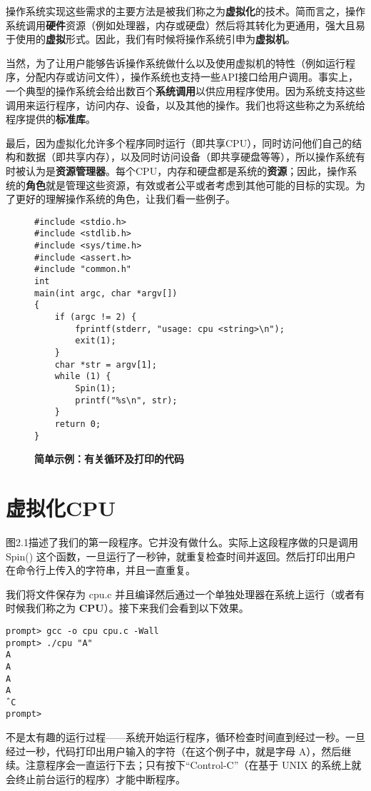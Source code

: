 操作系统实现这些需求的主要方法是被我们称之为\textbf{虚拟化}的技术。简而言之，操作系统调用\textbf{硬件}资源（例如处理器，内存或硬盘）然后将其转化为更通用，强大且易于使用的\textbf{虚拟}形式。因此，我们有时候将操作系统引申为\textbf{虚拟机}。

当然，为了让用户能够告诉操作系统做什么以及使用虚拟机的特性（例如运行程序，分配内存或访问文件），操作系统也支持一些API接口给用户调用。事实上，一个典型的操作系统会给出数百个\textbf{系统调用}以供应用程序使用。因为系统支持这些调用来运行程序，访问内存、设备，以及其他的操作。我们也将这些称之为系统给程序提供的\textbf{标准库}。

最后，因为虚拟化允许多个程序同时运行（即共享CPU），同时访问他们自己的结构和数据（即共享内存），以及同时访问设备（即共享硬盘等等），所以操作系统有时被认为是\textbf{资源管理器}。每个CPU，内存和硬盘都是系统的\textbf{资源}；因此，操作系统的\textbf{角色}就是管理这些资源，有效或者公平或者考虑到其他可能的目标的实现。为了更好的理解操作系统的角色，让我们看一些例子。

\newpage

\begin{figure}[ht]
\begin{lstlisting}  
#include <stdio.h> 
#include <stdlib.h> 
#include <sys/time.h> 
#include <assert.h> 
#include "common.h"
int
main(int argc, char *argv[])
{
    if (argc != 2) {
        fprintf(stderr, "usage: cpu <string>\n");
        exit(1);
    }
    char *str = argv[1];
    while (1) {
        Spin(1);
        printf("%s\n", str);
    }
    return 0;
}
\end{lstlisting}
\caption{\textbf{简单示例：有关循环及打印的代码}}
\end{figure}

\section{虚拟化CPU}
    
图2.1描述了我们的第一段程序。它并没有做什么。实际上这段程序做的只是调用 Spin() 这个函数，一旦运行了一秒钟，就重复检查时间并返回。然后打印出用户在命令行上传入的字符串，并且一直重复。

我们将文件保存为 cpu.c 并且编译然后通过一个单独处理器在系统上运行（或者有时候我们称之为 \textbf{CPU}）。接下来我们会看到以下效果。

\begin{verbatim}
prompt> gcc -o cpu cpu.c -Wall
prompt> ./cpu "A"
A
A
A
A
ˆC
prompt>
\end{verbatim}

不是太有趣的运行过程——系统开始运行程序，循环检查时间直到经过一秒。一旦经过一秒，代码打印出用户输入的字符（在这个例子中，就是字母 A），然后继续。注意程序会一直运行下去；只有按下“Control-C”（在基于 UNIX 的系统上就会终止前台运行的程序）才能中断程序。


